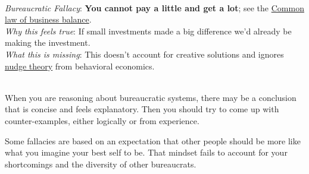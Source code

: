 \ \\
\begin{samepage}
\textit{Bureaucratic Fallacy}: 
\textbf{You cannot pay a little and get a lot}; see the \href{https://en.wikipedia.org/wiki/Common_law_of_business_balance}{Common law of business balance}. 
%
 \\
\textit{Why this feels true}: If small investments made a big difference we'd already be making the investment.\\
\textit{What this is missing}: This doesn't account for creative solutions and ignores \href{https://en.wikipedia.org/wiki/Nudge_theory}{nudge theory}
from behavioral economics. 
\end{samepage}

\ \\

When you are reasoning about bureaucratic systems, there may be a conclusion that is concise and feels explanatory. Then you should try to come up with counter-examples, either logically or from experience.  

Some fallacies are based on an expectation that other people should be more like what you imagine your best self to be. That mindset fails to account for your shortcomings and the diversity of other bureaucrats. 

